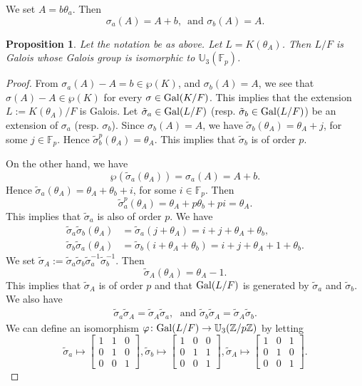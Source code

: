 \documentclass[12pt,leqno]{amsart}
\theoremstyle{plain}
\newtheorem{prop}[thm]{Proposition}
\theoremstyle{definition}
\newcommand{\F}{{\mathbb F}}
\newcommand{\U}{{\mathbb U}}
\newcommand{\Z}{{\mathbb Z}}
\begin{document}
We set $A=b\theta_a$. Then 
\[
\sigma_a(A)= A+b,\, \text{ and } \sigma_b(A)=A.
\]
\begin{prop}
\label{prop:Heisenberg char p} Let the notation be as above. 
Let $L=K(\theta_A)$. Then $L/F$ is Galois whose Galois group is isomorphic to $\U_3(\F_p)$. 
\end{prop}
\begin{proof}
From $\sigma_a(A)- A= b \in \wp(K)$, and $\sigma_b(A)=A$, we see that $\sigma(A)-A \in \wp(K)$ for every $\sigma \in {\rm Gal}(K/F)$. This implies that the extension $L:=K(\theta_{A})/F$ is Galois. Let $\tilde{\sigma}_a\in {\rm Gal}(L/F)$ (resp. $\tilde{\sigma}_b\in {\rm Gal}(L/F)$) be an extension of $\sigma_a$ (resp. $\sigma_b$). Since $\sigma_b(A)=A$, we have $\tilde{\sigma}_b(\theta_A)=\theta_{A}+j$, for some $j\in \F_p$. Hence $\tilde{\sigma}_b^p(\theta_A)=\theta_{A}$. This implies that $\tilde{\sigma}_b$ is of order $p$.

On the other hand, we have
\[
\wp(\tilde{\sigma}_a(\theta_{A}))=\sigma_a(A) =A +b.
\]
Hence $\tilde{\sigma}_a(\theta_{A})= \theta_{A}+\theta_{b}+i$, for some $i\in \F_p$. Then
\[
\tilde{\sigma}_a^p(\theta_{A})= \theta_{A} +p\theta_b+pi=\theta_{A}.
\]
This implies that $\tilde{\sigma}_a$ is also of order $p$. We have
\[
\begin{aligned}
\tilde{\sigma}_a\tilde{\sigma}_b(\theta_{A}) &= \tilde{\sigma}_a(j+\theta_{A})=i+j+\theta_{A}+\theta_{b},\\
\tilde{\sigma}_b\tilde{\sigma}_a(\theta_{A}) &=\tilde{\sigma}_b(i+ \theta_{A}+\theta_{b})={i+j}+\theta_{A}+1+\theta_{b}.
\end{aligned}
\]
We set $ \tilde{\sigma}_{A}:= \tilde{\sigma}_a \tilde{\sigma}_b\tilde{\sigma}_a^{-1}\tilde{\sigma}_b^{-1}$. Then
\[
\tilde{\sigma}_{A}(\theta_{A})=\theta_{A}-1.
\]
This implies that $\tilde{\sigma}_{A}$ is of order $p$ and that ${\rm Gal}(L/F)$ is generated by $\tilde{\sigma}_a$ and $\tilde{\sigma}_b$. We also have
\[
\begin{aligned}
\tilde{\sigma}_a \tilde{\sigma}_{A}= \tilde{\sigma}_{A}\tilde{\sigma}_a, \;\text{ and } \tilde{\sigma}_b \tilde{\sigma}_{A}= \tilde{\sigma}_{A}\tilde{\sigma}_b.
\end{aligned}
\]
We can define an isomorphism $\varphi \colon {\rm Gal}(L/F)\to \U_3(\Z/p\Z)$ by letting
\[
\tilde{\sigma}_a \mapsto \begin{bmatrix}
1& 1 & 0 \\
0& 1 & 0 \\
0& 0 & 1
\end{bmatrix},
\tilde{\sigma}_b\mapsto 
\begin{bmatrix}
1& 0 & 0 \\
0& 1 & 1 \\
0& 0 & 1 
\end{bmatrix},
\tilde{\sigma}_{A}\mapsto
\begin{bmatrix}
1& 0 & 1 \\
0& 1 & 0 \\
0& 0 & 1 
\end{bmatrix}.
\]


\end{proof}
\end{document}
